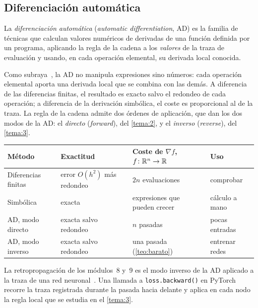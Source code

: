 \subsection{Diferenciación automática}

\begin{definicion}\label{def:ad}
La \emph{diferenciación automática} (\emph{automatic differentiation}, AD) es la familia de técnicas que calculan valores numéricos de derivadas de una función definida por un programa, aplicando la regla de la cadena a los \emph{valores} de la traza de evaluación y usando, en cada operación elemental, su derivada local conocida.
\end{definicion}

Como subraya~\cite[§3]{baydin}, la AD no manipula expresiones sino números: cada operación elemental aporta una derivada local que se combina con las demás. A diferencia de las diferencias finitas, el resultado es exacto salvo el redondeo de cada operación; a diferencia de la derivación simbólica, el coste es proporcional al de la traza. La regla de la cadena admite dos órdenes de aplicación, que dan los dos modos de la AD: el \emph{directo} (\emph{forward}), del \cref{tema:2}, y el \emph{inverso} (\emph{reverse}), del \cref{tema:3}.

\begin{center}\small
\begin{tabular}{@{}llll@{}}
\toprule
Método & Exactitud & Coste de $\nabla f$, $f\colon\mathbb{R}^{n}\to\mathbb{R}$ & Uso \\
\midrule
Diferencias finitas & error $O(h^{2})$ más redondeo & $2n$ evaluaciones & comprobar \\
Simbólica & exacta & expresiones que pueden crecer & cálculo a mano \\
AD, modo directo & exacta salvo redondeo & $n$ pasadas & pocas entradas \\
AD, modo inverso & exacta salvo redondeo & una pasada (\cref{teo:barato}) & entrenar redes \\
\bottomrule
\end{tabular}
\end{center}

\begin{observacion}
La retropropagación de los módulos~8 y~9 es el modo inverso de la AD aplicado a la traza de una red neuronal~\cite[§6.5]{gbc}. Una llamada a \texttt{loss.backward()} en PyTorch recorre la traza registrada durante la pasada hacia delante y aplica en cada nodo la regla local que se estudia en el \cref{tema:3}.
\end{observacion}

